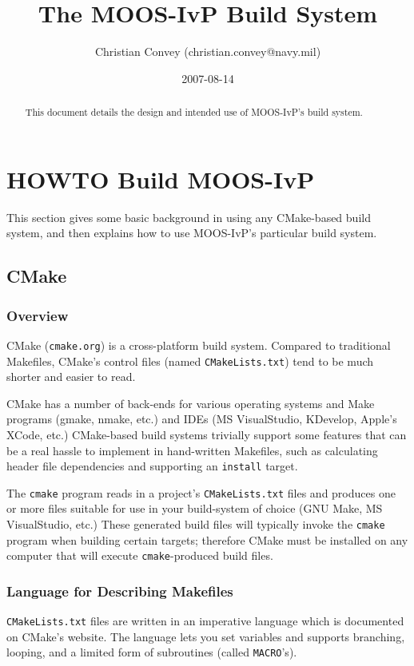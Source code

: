 \documentclass[letterpaper,10pt]{article}
\title{The MOOS-IvP Build System}
\author{Christian Convey (christian.convey@navy.mil)}
\date{2007-08-14}
\begin{document}
\maketitle

\begin{abstract}
This document details the design and intended use of MOOS-IvP's build system.
\end{abstract}

\tableofcontents

\parskip 7.2pt           %

\section{HOWTO Build MOOS-IvP}
This section gives some basic background in using any CMake-based build system,
and then explains how to use MOOS-IvP's particular build system.

\subsection{CMake}

\subsubsection{Overview}
CMake (\verb|cmake.org|) is a cross-platform build system.  Compared to traditional 
Makefiles, CMake's control files (named \verb|CMakeLists.txt|) tend to be much shorter
and easier to read.

CMake has a number of back-ends for various operating systems and Make programs
(gmake, nmake, etc.) and IDEs (MS VisualStudio, KDevelop, Apple's XCode, etc.)
CMake-based build systems trivially support some features that can be a real
hassle to implement in hand-written Makefiles, such as calculating header file
dependencies and supporting an \verb|install| target.

The \verb|cmake| program reads in a project's \verb|CMakeLists.txt| files and produces
one or more files suitable for use in your build-system of choice (GNU Make, 
MS VisualStudio, etc.)  These generated build files will typically invoke the
\verb|cmake| program when building certain targets; therefore CMake must be installed
on any computer that will execute \verb|cmake|-produced build files.

\subsubsection{Language for Describing Makefiles}
\verb|CMakeLists.txt| files are written in an imperative language which is
documented on CMake's website.  The language lets you set variables and
supports branching, looping, and a limited form of subroutines (called
\verb|MACRO|'s).
\end{document}
